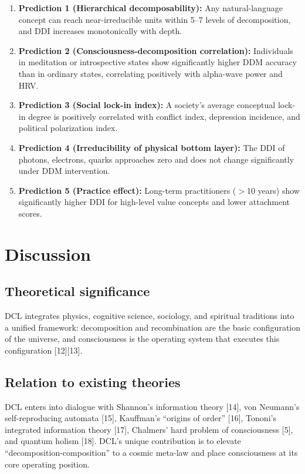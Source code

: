 \documentclass[11pt,a4paper]{article}
\begin{document}
\begin{enumerate}
    \item \textbf{Prediction 1 (Hierarchical decomposability):} Any natural-language concept can reach near-irreducible units within 5--7 levels of decomposition, and DDI increases monotonically with depth.
    \item \textbf{Prediction 2 (Consciousness-decomposition correlation):} Individuals in meditation or introspective states show significantly higher DDM accuracy than in ordinary states, correlating positively with alpha-wave power and HRV.
    \item \textbf{Prediction 3 (Social lock-in index):} A society's average conceptual lock-in degree is positively correlated with conflict index, depression incidence, and political polarization index.
    \item \textbf{Prediction 4 (Irreducibility of physical bottom layer):} The DDI of photons, electrons, quarks approaches zero and does not change significantly under DDM intervention.
    \item \textbf{Prediction 5 (Practice effect):} Long-term practitioners ($>$10 years) show significantly higher DDI for high-level value concepts and lower attachment scores.
\end{enumerate}

\section{Discussion}

\subsection{Theoretical significance}

DCL integrates physics, cognitive science, sociology, and spiritual traditions into a unified framework: decomposition and recombination are the basic configuration of the universe, and consciousness is the operating system that executes this configuration [12][13].

\subsection{Relation to existing theories}

DCL enters into dialogue with Shannon's information theory [14], von Neumann's self-reproducing automata [15], Kauffman's ``origins of order'' [16], Tononi's integrated information theory [17], Chalmers' hard problem of consciousness [5], and quantum holism [18]. DCL's unique contribution is to elevate ``decomposition-composition'' to a cosmic meta-law and place consciousness at its core operating position.
\end{document}
